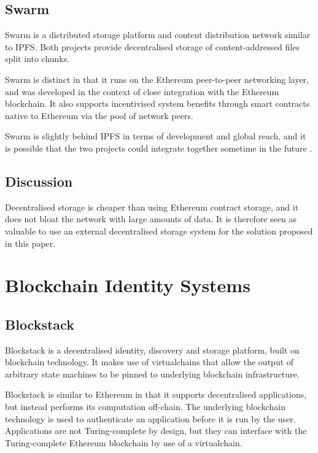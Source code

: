 \subsection{Swarm}
Swarm \cite{noauthor_swarm_nodate} is a distributed storage platform and content distribution network similar to \ac{IPFS}. Both projects provide decentralised storage of content-addressed files split into chunks.

Swarm is distinct in that it runs on the Ethereum peer-to-peer networking layer, and was developed in the context of close integration with the Ethereum blockchain. It also supports incentivised system benefits through smart contracts native to Ethereum via the pool of network peers.

Swarm is slightly behind \ac{IPFS} in terms of development and global reach, and it is possible that the two projects could integrate together sometime in the future \cite{ethersphere_ipfs_2017}.

\subsection{Discussion}
Decentralised storage is cheaper than using Ethereum contract storage, and it does not bloat the network with large amounts of data. It is therefore seen as valuable to use an external decentralised storage system for the solution proposed in this paper.

\section{Blockchain Identity Systems}
\label{sec:blockchain-identity}
\subsection{Blockstack}
Blockstack \cite{blockstack_inc._blockstack:_2017} is a decentralised identity, discovery and storage platform, built on blockchain technology. It makes use of virtualchains \cite{j_nelson_extending_2016} that allow the output of arbitrary state machines to be pinned to underlying blockchain infrastructure. 

Blockstack is similar to Ethereum in that it supports decentralised applications, but instead performs its computation off-chain. The underlying blockchain technology is used to authenticate an application before it is run by the user. Applications are not Turing-complete by design, but they can interface with the Turing-complete Ethereum blockchain by use of a virtualchain.

